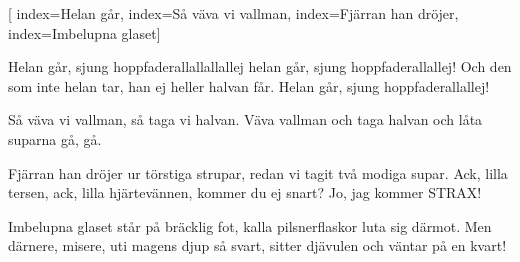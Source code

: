 [ 								
	index={Helan går}, 
	index={Så väva vi vallman},
	index={Fjärran han dröjer},
	index={Imbelupna glaset}]					
	
\beginverse*
Helan går, 
sjung hoppfaderallallallallej
helan går, 
sjung hoppfaderallallej!
Och den som inte helan tar, 
han ej heller halvan får. 
Helan går, 
sjung hoppfaderallallej!			
\endverse						
					
\beginverse*						
Så väva vi vallman,
så taga vi halvan.
Väva vallman och taga halvan
och låta suparna gå, gå.
\endverse						

\beginverse*						
Fjärran han dröjer ur törstiga strupar, 
redan vi tagit två modiga supar. 
Ack, lilla tersen, ack, lilla hjärtevännen, 
kommer du ej snart? Jo, jag kommer STRAX!
\endverse							

\beginverse*						
Imbelupna glaset står på bräcklig fot, 
kalla pilsnerflaskor luta sig därmot. 
Men därnere, misere, uti magens djup så svart,
sitter djävulen och väntar på en kvart!
\endverse					
\endsong							

